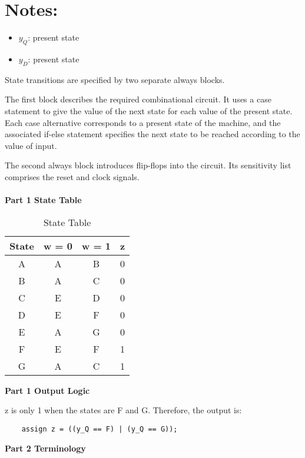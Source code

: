 \documentclass{article}
\begin{document}
\section*{Notes:}
\begin{itemize}
    \item $y_Q$: present state
    \item $y_D$: present state
\end{itemize}

State transitions are specified by two separate always blocks. 

The first block describes the required combinational circuit. It uses a case statement to give the value of the next state for each value of the present state. Each case alternative corresponds to a present state of the machine, and the associated if-else statement specifies the next state to be reached according to the value of input.

The second always block introduces flip-flops into the circuit. Its sensitivity list comprises the reset and clock signals.
\\
\\
\textbf{Part 1 State Table}

\begin{table}[ht]
    \centering
    \caption{State Table}
    \label{tab:state-table}
    \begin{tabular}{|c|c|c|c|}
    \hline
    \textbf{State} & \textbf{w = 0} & \textbf{w = 1} & \textbf{z} \\
    \hline
    A & A & B & 0\\
    \hline
    B & A & C & 0\\
    \hline
    C & E & D & 0\\
    \hline
    D & E & F & 0\\
    \hline
    E & A & G & 0\\
    \hline
    F & E & F & 1\\
    \hline
    G & A & C & 1\\

    \hline
    \end{tabular}
    \end{table}
\noindent\textbf{Part 1 Output Logic}

z is only 1 when the states are F and G. Therefore, the output is:

\begin{verbatim}
    assign z = ((y_Q == F) | (y_Q == G));
\end{verbatim}


\noindent\textbf{Part 2 Terminology}\\
\end{document}
